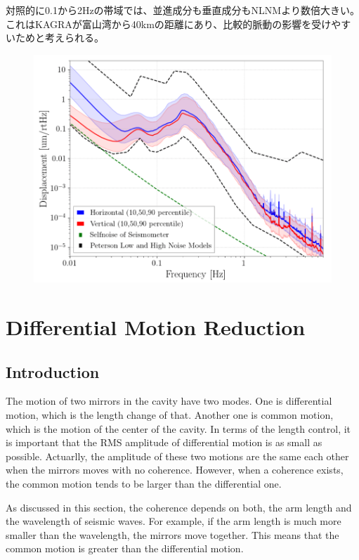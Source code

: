 対照的に0.1から2Hzの帯域では、並進成分も垂直成分もNLNMより数倍大きい。これはKAGRAが富山湾から40kmの距離にあり、比較的脈動の影響を受けやすいためと考えられる。

\begin{figure}[h]
  \begin{center}   
    \includegraphics[width=16.0cm]{./img_chap3/img313.png}
    \caption{}\label{img:img313}
  \end{center}
\end{figure}


\newpage
\section{Differential Motion Reduction} \label{sec:33}
\subsection{Introduction}
The motion of two mirrors in the cavity have two modes. One is differential motion, which is the length change of that. Another one is common motion, which is the motion of the center of the cavity. In terms of the length control, it is important that the RMS amplitude of differential motion is as small as possible. Actuarlly, the amplitude of these two motions are the same each other when the mirrors moves with no coherence. However, when a coherence exists, the common motion tends to be larger than the differential one. 

As discussed in this section, the coherence depends on both, the arm length and the wavelength of seismic waves. For example, if the arm length is much more smaller than the wavelength, the mirrors move together. This means that the common motion is greater than the differential motion.

